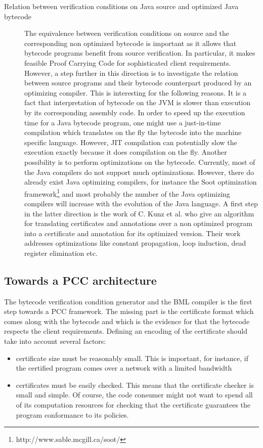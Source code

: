 \begin{description}
\item[Relation between verification conditions on Java source and optimized Java bytecode]
 The equivalence  between verification conditions on source and the corresponding non optimized bytecode is important as it
 allows that bytecode programs  benefit from source verification. In particular, it makes feasible Proof Carrying Code
 for sophisticated client requirements.
 However, a step further in this direction is to investigate the 
 relation between source programs and their bytecode counterpart produced by an optimizing compiler.
 This is interesting for the following reasons.
 It is a fact that interpretation of bytecode on the JVM is slower than execution by its corresponding assembly code. 
 In order to speed up the execution time for a Java bytecode program, one might use 
 a just-in-time compilation which  translates on the fly the bytecode into the machine specific language. However, JIT compilation can potentially slow
 the execution exactly because it does compilation on the fly.  Another possibility is to perform 
 optimizations on the bytecode. Currently, most of the  Java compilers do not support much optimizations.
 However, there do already exist Java optimizing compilers, for instance the Soot optimization framework\footnote{http://www.sable.mcgill.ca/soot/} 
 and most probably the number of the Java optimizing compilers will increase with the evolution of the Java language.
 A first step in the latter direction is the work of C. Kunz et al.\cite{BGKRsas06} who give an algorithm for translating 
 certificates and annotations over a non optimized program into a certificate  and annotation for its optimized version.
 Their work addresses  optimizations like constant propagation, loop induction, dead register elimination etc. 
\end{description}
\subsection{Towards a PCC architecture}

The bytecode verification condition generator and the BML compiler is the first step towards a PCC framework. 
The missing  part is  the certificate format which comes along with the bytecode and which  is the evidence for 
that the bytecode respects the client requirements. Defining an encoding of the certificate should take into account several factors:
\begin{itemize} 
  \item certificate size must be reasonably small. This is important, for
  instance,  if the certified program comes over a network with a limited  bandwidth
  \item certificates must be easily checked. This means that the certificate checker is  small and simple.
               Of course, the code consumer might not want to spend all of its computation 
              resources for checking that the certificate guarantees the program conformance to its policies.     
\end{itemize}

